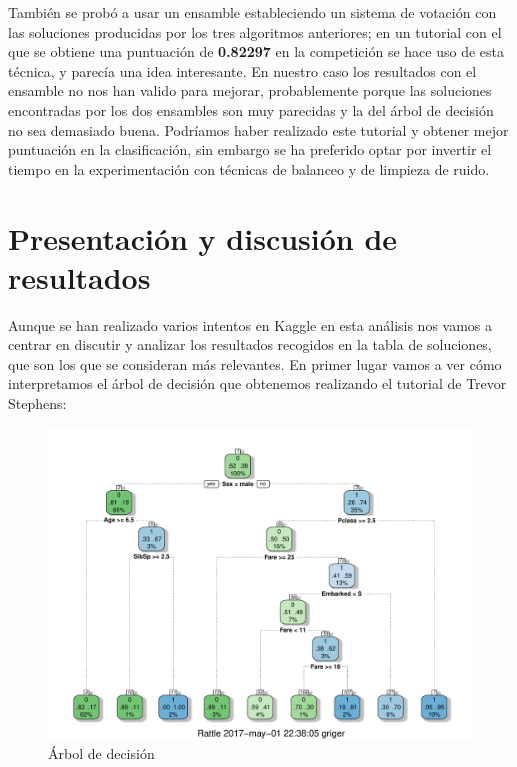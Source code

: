 \documentclass[10pt,a4paper]{article}
\begin{document}
También se probó a usar un ensamble estableciendo un sistema de votación con las soluciones producidas por los tres algoritmos anteriores; en un tutorial con el que se obtiene una puntuación de \textbf{0.82297} en la competición se hace uso de esta técnica, y parecía una idea interesante. En nuestro caso los resultados con el ensamble no nos han valido para mejorar, probablemente porque las soluciones encontradas por los dos ensambles son muy parecidas y la del árbol de decisión no sea demasiado buena. Podríamos haber realizado este tutorial y obtener mejor puntuación en la clasificación, sin embargo se ha preferido optar por invertir el tiempo en la experimentación con técnicas de balanceo y de limpieza de ruido.

\section{Presentación y discusión de resultados}

Aunque se han realizado varios intentos en Kaggle en esta análisis nos vamos a centrar en discutir y analizar los resultados recogidos en la tabla de soluciones, que son los que se consideran más relevantes. En primer lugar vamos a ver cómo interpretamos el árbol de decisión que obtenemos realizando el tutorial de Trevor Stephens:

\begin{figure}[H]
  \centering
  \includegraphics[width=\textwidth]{imgs/tree.pdf}
  \caption{Árbol de decisión}
\end{figure}
\end{document}

